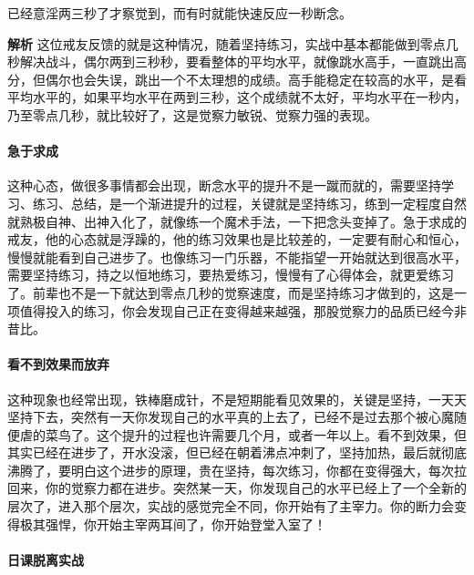 \begin{case}
    已经意淫两三秒了才察觉到，而有时就能快速反应一秒断念。

    \textbf{解析} 这位戒友反馈的就是这种情况，随着坚持练习，实战中基本都能做到零点几秒解决战斗，偶尔两到三秒秒，要看整体的平均水平，就像跳水高手，一直跳出高分，但偶尔也会失误，跳出一个不太理想的成绩。高手能稳定在较高的水平，是看平均水平的，如果平均水平在两到三秒，这个成绩就不太好，平均水平在一秒内，乃至零点几秒，就比较好了，这是觉察力敏锐、觉察力强的表现。
\end{case}

\paragraph{急于求成}

这种心态，做很多事情都会出现，断念水平的提升不是一蹴而就的，需要坚持学习、练习、总结，是一个渐进提升的过程，关键就是坚持练习，练到一定程度自然就熟极自神、出神入化了，就像练一个魔术手法，一下把念头变掉了。急于求成的戒友，他的心态就是浮躁的，他的练习效果也是比较差的，一定要有耐心和恒心，慢慢就能看到自己进步了。也像练习一门乐器，不能指望一开始就达到很高水平，需要坚持练习，持之以恒地练习，要热爱练习，慢慢有了心得体会，就更爱练习了。前辈也不是一下就达到零点几秒的觉察速度，而是坚持练习才做到的，这是一项值得投入的练习，你会发现自己正在变得越来越强，那股觉察力的品质已经今非昔比。

\paragraph{看不到效果而放弃}

这种现象也经常出现，铁棒磨成针，不是短期能看见效果的，关键是坚持，一天天坚持下去，突然有一天你发现自己的水平真的上去了，已经不是过去那个被心魔随便虐的菜鸟了。这个提升的过程也许需要几个月，或者一年以上。看不到效果，但其实已经在进步了，开水没滚，但已经在朝着沸点冲刺了，坚持加热，最后就彻底沸腾了，要明白这个进步的原理，贵在坚持，每次练习，你都在变得强大，每次拉回来，你的觉察力都在进步。突然某一天，你发现自己的水平已经上了一个全新的层次了，进入那个层次，实战的感觉完全不同，你开始有了主宰力。你的断力会变得极其强悍，你开始主宰两耳间了，你开始登堂入室了！

\paragraph{日课脱离实战}

